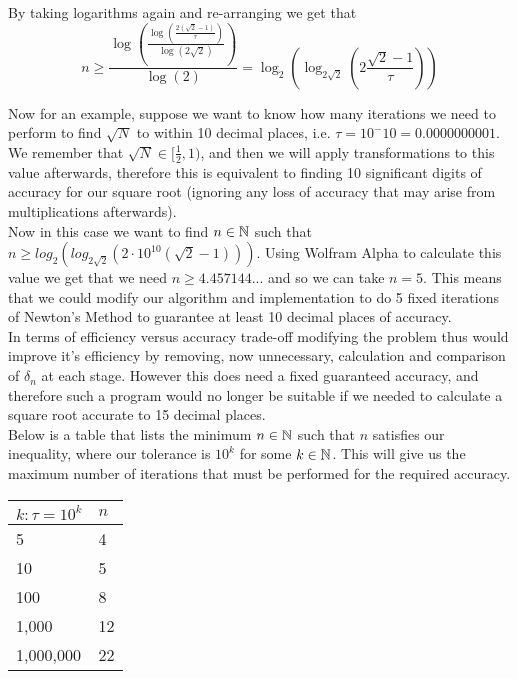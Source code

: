 By taking logarithms again and re-arranging we get that
\[n \ge \frac{\log\left(\frac{\log\left(\frac{2(\sqrt{2} - 1)}{\tau}\right)}{\log(2\sqrt{2})}\right)}{\log(2)} = \log_2\left(\log_{2\sqrt{2}}\left(2\frac{\sqrt{2} - 1}{\tau}\right)\right)\]

Now for an example, suppose we want to know how many iterations we need to perform to find \(\sqrt{N}\) to within 10 decimal places, i.e. \(\tau = 10^-10 = 0.0000000001\). We remember that \(\sqrt{N} \in [\frac{1}{2}, 1)\), and then we will apply transformations to this value afterwards, therefore this is equivalent to finding 10 significant digits of accuracy for our square root (ignoring any loss of accuracy that may arise from multiplications afterwards).\\

Now in this case we want to find \(n \in \mathbb{N}\) such that \(n \ge log_2(log_{2\sqrt{2}}(2\cdot10^{10}(\sqrt{2}-1)))\). Using Wolfram Alpha to calculate this value we get that we need \(n \ge 4.457144...\) and so we can take \(n = 5\). This means that we could modify our algorithm and implementation to do 5 fixed iterations of Newton's Method to guarantee at least 10 decimal places of accuracy.\\

In terms of efficiency versus accuracy trade-off modifying the problem thus would improve it's efficiency by removing, now unnecessary, calculation and comparison of \(\delta_n\) at each stage. However this does need a fixed guaranteed accuracy, and therefore such a program would no longer be suitable if we needed to calculate a square root accurate to 15 decimal places.\\

Below is a table that lists the minimum \(n \in \mathbb{N}\) such that \(n\) satisfies our inequality, where our tolerance is \(10^k\) for some \(k \in \mathbb{N}\). This will give us the maximum number of iterations that must be performed for the required accuracy.

\begin{center}
\begin{tabular}{|p{3cm}|p{3cm}|}
\hline
\(k : \tau = 10^k\) & \(n\)\\\hline
5 & 4 \\\hline
10 & 5 \\\hline
100 & 8 \\\hline
1,000 & 12 \\\hline
1,000,000 & 22\\\hline
\end{tabular}
\end{center}

